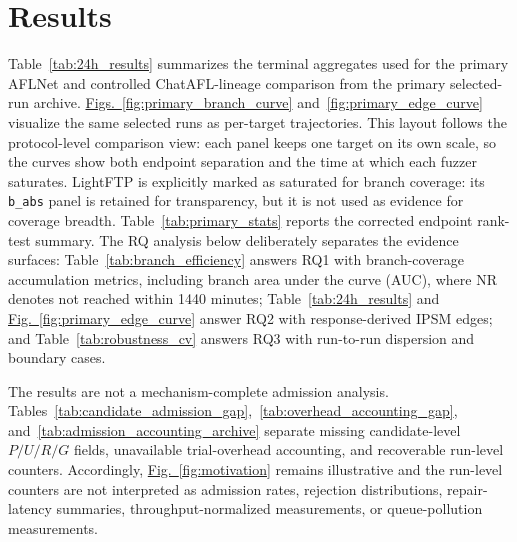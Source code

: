 \documentclass[final,5p,times,number]{elsarticle}
\newcommand{\figref}[1]{\hyperref[#1]{Fig.~\ref*{#1}}}
\newcommand{\figsref}[2]{\hyperref[#1]{Figs.~\ref*{#1}} and~\hyperref[#2]{\ref*{#2}}}
\begin{document}
\section{Results}

Table~\ref{tab:24h_results} summarizes the terminal aggregates used for the primary AFLNet and controlled ChatAFL-lineage comparison from the primary selected-run archive. \figsref{fig:primary_branch_curve}{fig:primary_edge_curve} visualize the same selected runs as per-target trajectories. This layout follows the protocol-level comparison view: each panel keeps one target on its own scale, so the curves show both endpoint separation and the time at which each fuzzer saturates. LightFTP is explicitly marked as saturated for branch coverage: its \texttt{b\_abs} panel is retained for transparency, but it is not used as evidence for coverage breadth. Table~\ref{tab:primary_stats} reports the corrected endpoint rank-test summary. The RQ analysis below deliberately separates the evidence surfaces: Table~\ref{tab:branch_efficiency} answers RQ1 with branch-coverage accumulation metrics, including branch area under the curve (AUC), where NR denotes not reached within 1440 minutes; Table~\ref{tab:24h_results} and \figref{fig:primary_edge_curve} answer RQ2 with response-derived IPSM edges; and Table~\ref{tab:robustness_cv} answers RQ3 with run-to-run dispersion and boundary cases.

The results are not a mechanism-complete admission analysis. Tables~\ref{tab:candidate_admission_gap},~\ref{tab:overhead_accounting_gap}, and~\ref{tab:admission_accounting_archive} separate missing candidate-level $P/U/R/G$ fields, unavailable trial-overhead accounting, and recoverable run-level counters. Accordingly, \figref{fig:motivation} remains illustrative and the run-level counters are not interpreted as admission rates, rejection distributions, repair-latency summaries, throughput-normalized measurements, or queue-pollution measurements.
\end{document}
